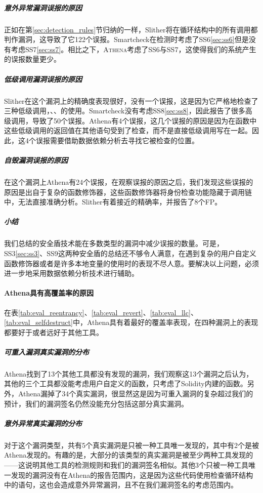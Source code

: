 \subparagraph{意外异常漏洞误报的原因}

正如在第\ref{sec:detection_rules}节归纳的一样，Slither将在循环结构中的所有调用都判作漏洞，这导致了它122个误报。Smartcheck在检测时考虑了SS6\ref{sec:ss6}但是没有考虑SS7\ref{sec:ss7}。相比之下，\textsc{Athena}考虑了SS6与SS7，这使得我们的系统产生的误报数量更少。

\subparagraph{低级调用漏洞误报的原因}

Slither在这个漏洞上的精确度表现很好，没有一个误报，这是因为它严格地检查了三种低级调用，、、的使用。Smartcheck没有考虑SS8\ref{sec:ss8}，因此报告了很多高级调用，导致了50个误报。Athena有4个误报，这几个误报的原因是因为在函数中这些低级调用的返回值在其他语句受到了检查，而不是直接低级调用写在一起。因此，这4个误报需要借助数据依赖分析去寻找它被检查的位置。

\subparagraph{自毁漏洞误报的原因}

在这个漏洞上Athena有24个误报，在观察误报的原因之后，我们发现这些误报的原因是出自于复杂的函数修饰器，这些函数修饰器将身份检查功能隐藏于调用链中，无法直接准确分析。Slither有着接近的精确率，并报告了8个FP。

\subparagraph{小结}

我们总结的安全盾技术能在多数类型的漏洞中减少误报的数量。可是，SS3\ref{sec:ss3}、SS9\label{sec:ss9}这两种安全盾的总结还不够令人满意，在遇到复杂的用户自定义函数修饰器或者是许多本地变量的使用时的表现不尽人意。要解决以上问题，必须进一步地采用数据依赖分析技术进行辅助。

\paragraph{Athena具有高覆盖率的原因}

在表\ref{tab:eval_reentrancy}、\ref{tab:eval_revert}、\ref{tab:eval_llc}、\ref{tab:eval_selfdestruct}中，Athena具有着最好的覆盖率表现，在四种漏洞上的表现都要好于或者远好于其他工具。

\subparagraph{可重入漏洞真实漏洞的分布}

Athena找到了13个其他工具都没有发现的漏洞，我们观察这13个漏洞之后认为，其他的三个工具都没能考虑用户自定义的函数，只考虑了Solidity内建的函数。另外，Athena漏掉了34个真实漏洞，很显然这是因为可重入漏洞的复杂超过我们的预计，我们的漏洞签名仍然没能充分包括这部分真实漏洞。

\subparagraph{意外异常真实漏洞的分布}

对于这个漏洞类型，共有5个真实漏洞是只被一种工具唯一发现的，其中有2个是被Athena发现的。有趣的是，大部分的该类型的真实漏洞是被至少两种工具发现的——这说明其他工具的检测规则和我们的漏洞签名相似。其他3个只被一种工具唯一发现的漏洞没有在Athena的报告范围内，这是因为这些代码使用检查循环结构中的语句，这也会造成意外异常漏洞，且不在我们漏洞签名的考虑范围内。

